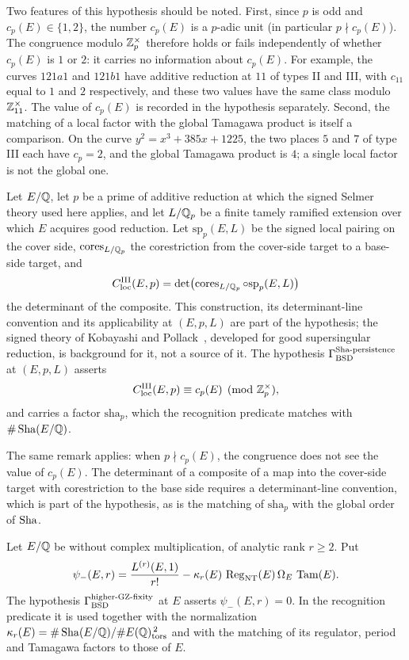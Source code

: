 Two features of this hypothesis should be noted.  First, since $p$ is odd
and $c_p(E)\in\{1,2\}$, the number $c_p(E)$ is a $p$-adic unit (in
particular $p\nmid c_p(E)$).  The congruence modulo $\mathbb{Z}_p^\times$ therefore
holds or fails independently of whether $c_p(E)$ is $1$ or $2$: it carries
no information about $c_p(E)$.  For example, the curves $121a1$ and
$121b1$ have additive reduction at $11$ of types II and III, with $c_{11}$
equal to $1$ and $2$ respectively, and these two values have the same
class modulo $\mathbb{Z}_{11}^\times$.  The value of $c_p(E)$ is recorded in the
hypothesis separately.  Second, the matching of a local factor with the
global Tamagawa product is itself a comparison.  On the curve
$y^2=x^3+385x+1225$, the two places $5$ and $7$ of type III each have
$c_p=2$, and the global Tamagawa product is $4$; a single local factor is
not the global one.

\begin{definition}\label{def:closure:gamma-sha-persistence}
Let $E/\mathbb{Q}$, let $p$ be a prime of additive reduction at which the signed
Selmer theory used here applies, and let $L/\mathbb{Q}_p$ be a finite tamely
ramified extension over which $E$ acquires good reduction.  Let
$\mathrm{sp}_p(E,L)$ be the signed local pairing on the cover side,
$\operatorname{cores}_{L/\mathbb{Q}_p}$ the corestriction from the cover-side target to a
base-side target, and
\[
  C_{\mathrm{loc}}^{\mathrm{III}}(E,p)
  =
  \det\bigl(\operatorname{cores}_{L/\mathbb{Q}_p}\circ \mathrm{sp}_p(E,L)\bigr)
\]
the determinant of the composite.  This construction, its
determinant-line convention and its applicability at $(E,p,L)$ are part
of the hypothesis; the signed theory of Kobayashi and
Pollack~\citep{Kobayashi2003,Pollack2003}, developed for good
supersingular reduction, is background for it, not a source of it.  The
hypothesis $\Gamma_{\mathrm{BSD}}^{\mathrm{Sha\text{-}persistence}}$ at $(E,p,L)$ asserts
\[
  C_{\mathrm{loc}}^{\mathrm{III}}(E,p)
  \equiv c_p(E)\pmod{\mathbb{Z}_p^\times},
\]
and carries a factor $\mathrm{sha}_p$, which the recognition predicate
matches with $\#\operatorname{Sha}(E/\mathbb{Q})$.
\end{definition}

The same remark applies: when $p\nmid c_p(E)$, the congruence does not
see the value of $c_p(E)$.  The determinant of a composite of a map into
the cover-side target with corestriction to the base side requires a
determinant-line convention, which is part of the hypothesis, as is the
matching of $\mathrm{sha}_p$ with the global order of $\operatorname{Sha}$.

\begin{definition}\label{def:closure:gamma-higher-gz-fixity}
Let $E/\mathbb{Q}$ be without complex multiplication, of analytic rank $r\ge2$.
Put
\[
  \psi_-(E,r)
  =
  \frac{L^{(r)}(E,1)}{r!}
  -
  \kappa_r(E)\,\operatorname{Reg}_{\mathrm{NT}}(E)\,\Omega_E\,\operatorname{Tam}(E).
\]
The hypothesis $\Gamma_{\mathrm{BSD}}^{\mathrm{higher\text{-}GZ\text{-}fixity}}$ at $E$ asserts $\psi_-(E,r)=0$.  In the
recognition predicate it is used together with the normalization
$\kappa_r(E)=\#\operatorname{Sha}(E/\mathbb{Q})/\#E(\mathbb{Q})_{\operatorname{tors}}^{\,2}$ and with the matching of
its regulator, period and Tamagawa factors to those of $E$.
\end{definition}

